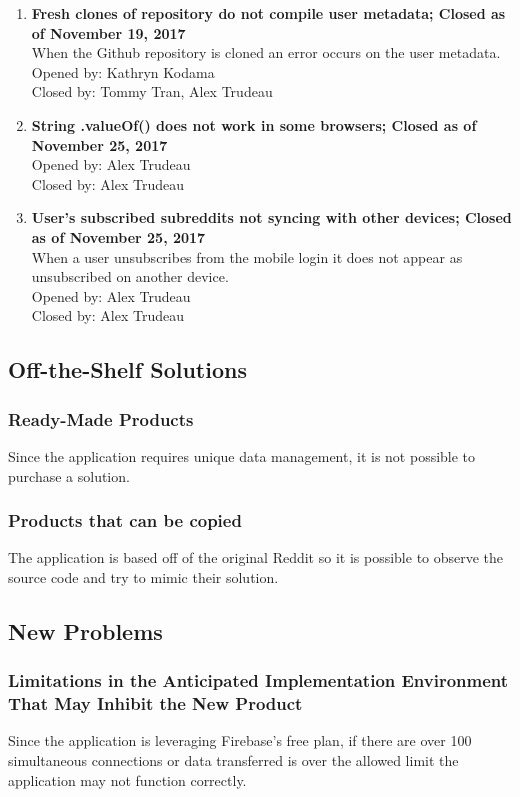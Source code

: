 \documentclass[12pt,fleqn]{article}
\begin{document}
{\begin{enumerate}
\item \textbf{Fresh clones of repository do not compile user metadata; Closed as of November 19, 2017} \\
When the Github repository is cloned an error occurs on the user metadata. \\
Opened by: Kathryn Kodama \\
Closed by: Tommy Tran, Alex Trudeau \\

\item \textbf{String .valueOf() does not work in some browsers; Closed as of November 25, 2017} \\
Opened by: Alex Trudeau \\
Closed by: Alex Trudeau \\

\item \textbf{User's subscribed subreddits not syncing with other devices; Closed as of November 25, 2017} \\
When a user unsubscribes from the mobile login it does not appear as unsubscribed on another device. \\
Opened by: Alex Trudeau \\
Closed by: Alex Trudeau \\

\end{enumerate}}

\subsection {Off-the-Shelf Solutions}

\subsubsection{Ready-Made Products}
Since the application requires unique data management, it is not possible to purchase a solution.
\subsubsection{Products that can be copied}
The application is based off of the original Reddit so it is possible to observe the source code and try to mimic their solution.

\subsection {New Problems}
\subsubsection {Limitations in the Anticipated Implementation
Environment That May Inhibit the New Product}
Since the application is leveraging Firebase's free plan, if there are over 100 simultaneous connections or data transferred is over the allowed limit the application may not function correctly.
\end{document}
